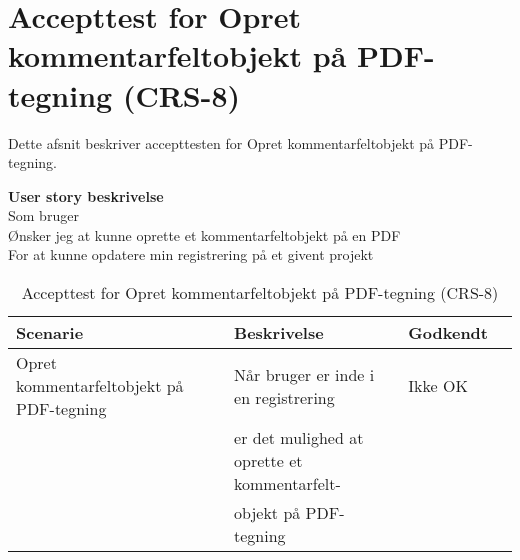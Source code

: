 \section{Accepttest for Opret kommentarfeltobjekt på PDF-tegning (CRS-8)}
Dette afsnit beskriver accepttesten for Opret kommentarfeltobjekt på PDF-tegning.

\textbf{User story beskrivelse} \\
Som bruger \\
Ønsker jeg at kunne oprette et kommentarfeltobjekt på en PDF \\
For at kunne opdatere min registrering på et givent projekt

\begin{table}[H]
	\centering
	\begin{tabular}{|ll|l|ll|} \hline
		\textbf{Scenarie} &  & \textbf{Beskrivelse}&  \textbf{Godkendt}&  \\ \hline
		Opret kommentarfeltobjekt på PDF-tegning&  &  Når bruger er inde i en registrering &  Ikke OK&  \\
		& & er det mulighed at oprette et kommentarfelt- & & \\ 
		& & objekt på PDF-tegning& & \\ \hline
	\end{tabular}
	\caption{Accepttest for Opret kommentarfeltobjekt på PDF-tegning (CRS-8)}
	\label{AcceptKommentarfelt}
\end{table}

\clearpage